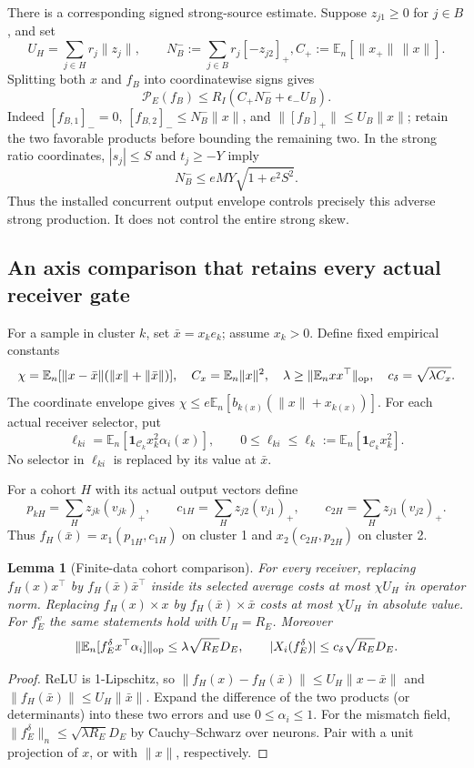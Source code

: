 \documentclass{article} %
\theoremstyle{plain}
\newtheorem{lemma}[theorem]{Lemma}
\theoremstyle{definition}
\theoremstyle{remark}
\begin{document}
There is a corresponding signed strong-source estimate. Suppose
$z_{j1}\ge0$ for $j\in B$, and set
\[
 U_H=\sum_{j\in H}r_j\|z_j\|,\qquad
 N_B^-:=\sum_{j\in B}r_j[-z_{j2}]_+,
 C_+:=\mathbb E_n[\|x_+\|\,\|x\|].
\]
Splitting both $x$ and $f_B$ into coordinatewise signs gives
\begin{equation}\label{sbcouple:strong-one-sided}
 \mathscr P_E(f_B)\le R_I(C_+N_B^-+\epsilon_-U_B).
\end{equation}
Indeed $[f_{B,1}]_-=0$, $[f_{B,2}]_-\le N_B^-\|x\|$, and
$\|[f_B]_+\|\le U_B\|x\|$; retain the two favorable products before
bounding the remaining two. In the strong ratio coordinates, $|s_j|\le S$
and $t_j\ge-Y$ imply
\[
 N_B^-\le e M Y\sqrt{1+e^2S^2}.
\]
Thus the installed concurrent output envelope controls precisely this
adverse strong production. It does not control the entire strong skew.

\subsection{An axis comparison that retains every actual receiver gate}

For a sample in cluster $k$, set $\bar x=x_ke_k$; assume $x_k>0$.
Define fixed empirical constants
\[
 \chi=\mathbb E_n[\|x-\bar x\|(\|x\|+\|\bar x\|)],\quad
 C_x=\mathbb E_n\|x\|^2,\quad
 \lambda\ge\|\mathbb E_nxx^\top\|_{\rm op},\quad
 c_\delta=\sqrt{\lambda C_x}.
\]
The coordinate envelope gives
$\chi\le e\mathbb E_n[b_{k(x)}(\|x\|+x_{k(x)})]$.
For each actual receiver selector, put
\[
 \ell_{ki}=\mathbb E_n[\mathbf1_{\mathcal C_k}x_k^2\alpha_i(x)],
 \qquad 0\le\ell_{ki}\le\ell_k:=\mathbb E_n[\mathbf1_{\mathcal C_k}x_k^2].
\]
No selector in $\ell_{ki}$ is replaced by its value at $\bar x$.

For a cohort $H$ with its actual output vectors define
\[
 p_{kH}=\sum_H z_{jk}(v_{jk})_+,\qquad
 c_{1H}=\sum_H z_{j2}(v_{j1})_+,\qquad
 c_{2H}=\sum_H z_{j1}(v_{j2})_+.
\]
Thus $f_H(\bar x)=x_1(p_{1H},c_{1H})$ on cluster 1 and
$x_2(c_{2H},p_{2H})$ on cluster 2.

\begin{lemma}[Finite-data cohort comparison]
\label{sbcouple:axis}
For every receiver, replacing $f_H(x)x^\top$ by
$f_H(\bar x)\bar x^\top$ inside its selected average costs at most
$\chi U_H$ in operator norm. Replacing $f_H(x)\times x$ by
$f_H(\bar x)\times\bar x$ costs at most $\chi U_H$ in absolute value.
For $f_E^v$ the same statements hold with $U_H=R_E$.
Moreover
\[
 \|\mathbb E_n[f_E^\delta x^\top\alpha_i]\|_{\rm op}
       \le\lambda\sqrt{R_E}D_E,\qquad
 |X_i(f_E^\delta)|\le c_\delta\sqrt{R_E}D_E.
\]
\end{lemma}
\begin{proof}
ReLU is 1-Lipschitz, so
$\|f_H(x)-f_H(\bar x)\|\le U_H\|x-\bar x\|$ and
$\|f_H(\bar x)\|\le U_H\|\bar x\|$.
Expand the difference of the two products (or determinants) into these
two errors and use $0\le\alpha_i\le1$. For the mismatch field,
$\|f_E^\delta\|_n\le\sqrt{\lambda R_E}D_E$ by Cauchy--Schwarz over
neurons. Pair with a unit projection of $x$, or with $\|x\|$, respectively.
\end{proof}
\end{document}
